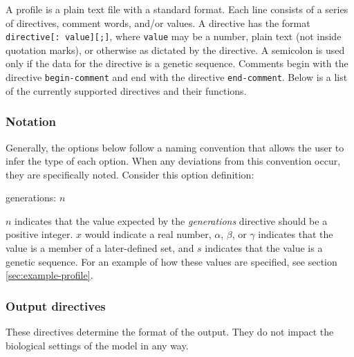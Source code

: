 \documentclass{article}
\begin{document}
      A profile is a plain text file with a standard format. Each line consists
      of a series of directives, comment words, and/or values. A directive has
      the format \verb|directive[: value][;]|, where \verb|value| may be a
      number, plain text (not inside quotation marks), or otherwise as dictated
      by the directive. A semicolon is used only if the data for the directive
      is a genetic sequence. Comments begin with the directive
      \verb|begin-comment| and end with the directive \verb|end-comment|. Below
      is a list of the currently supported directives and their functions.

      \subsubsection{Notation}
        \label{sec:notation}

        Generally, the options below follow a naming convention that allows the
        user to infer the type of each option. When any deviations from this
        convention occur, they are specifically noted. Consider this option
        definition:

        \begin{center}
          generations: $n$
        \end{center}

        \noindent $n$ indicates that the value expected by the {\em generations}
        directive should be a positive integer. $x$ would indicate a real
        number, $\alpha$, $\beta$, or $\gamma$ indicates that the value is a
        member of a later-defined set, and $s$ indicates that the value is a
        genetic sequence. For an example of how these values are specified, see
        section \ref{sec:example-profile}.

      \subsubsection{Output directives}
        \label{sec:output-directives}

        These directives determine the format of the output. They do not impact
        the biological settings of the model in any way.
\end{document}
